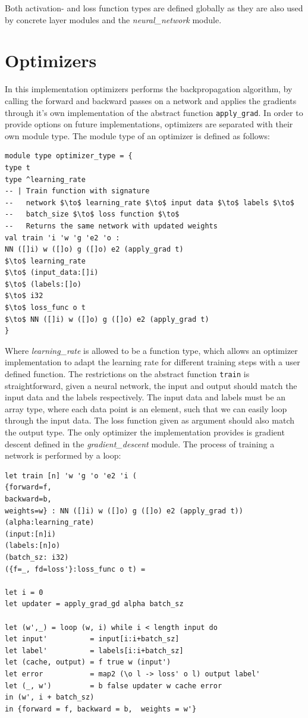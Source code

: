 Both activation- and loss function types are defined globally as they are also
used by concrete layer modules and the \emph{neural\_network} module.

\section{Optimizers}
In this implementation optimizers performs the backpropagation algorithm, by
calling the forward and backward passes on a network and applies the gradients
through it's own implementation of the abstract function \texttt{apply\_grad}. 
In order to provide options on future implementations, optimizers are separated
with their own module type. 
The module type of an optimizer is defined as follows:
\begin{lstlisting}[language=futhark, caption = {Abstract optimizer module}]
module type optimizer_type = {
type t
type ^learning_rate
-- | Train function with signature
--   network $\to$ learning_rate $\to$ input data $\to$ labels $\to$ 
--   batch_size $\to$ loss function $\to$ 
--   Returns the same network with updated weights
val train 'i 'w 'g 'e2 'o : 
NN ([]i) w ([]o) g ([]o) e2 (apply_grad t)
$\to$ learning_rate 
$\to$ (input_data:[]i) 
$\to$ (labels:[]o) 
$\to$ i32 
$\to$ loss_func o t 
$\to$ NN ([]i) w ([]o) g ([]o) e2 (apply_grad t)
}
\end{lstlisting}
Where \emph{learning\_rate} is allowed to be a function type, which allows an
optimizer implementation to adapt the learning rate for different training steps
with a user defined function. 
The restrictions on the abstract function \texttt{train} is straightforward,
given a neural network, the input and output should match the input data and the
labels respectively. 
The input data and labels must be an array type, where each data point is an
element, such that we can easily loop through the input data. 
The loss function given as argument should also match the output type. 
The only optimizer the implementation provides is gradient descent defined in
the \emph{gradient\_descent} module. 
The process of training a network is performed by a loop:
\begin{lstlisting}[language=futhark, caption ={Train function in gradient
descent module}]
let train [n] 'w 'g 'o 'e2 'i (
{forward=f,
backward=b,
weights=w} : NN ([]i) w ([]o) g ([]o) e2 (apply_grad t))
(alpha:learning_rate)
(input:[n]i)
(labels:[n]o)
(batch_sz: i32)
({f=_, fd=loss'}:loss_func o t) =

let i = 0
let updater = apply_grad_gd alpha batch_sz

let (w',_) = loop (w, i) while i < length input do
let input'          = input[i:i+batch_sz]
let label'          = labels[i:i+batch_sz]
let (cache, output) = f true w (input')
let error           = map2 (\o l -> loss' o l) output label'
let (_, w')         = b false updater w cache error
in (w', i + batch_sz)
in {forward = f, backward = b,  weights = w'}


\end{lstlisting}
